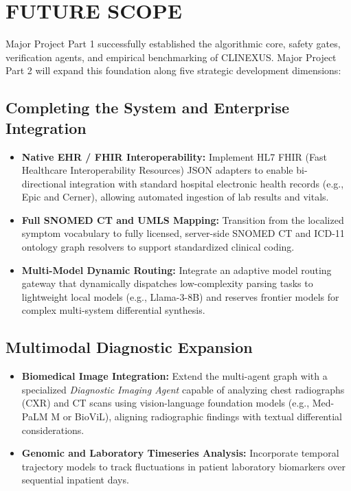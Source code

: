 \documentclass[12pt,a4paper]{report}
\begin{document}
\chapter{FUTURE SCOPE}

Major Project Part 1 successfully established the algorithmic core, safety gates, verification agents, and empirical benchmarking of CLINEXUS. Major Project Part 2 will expand this foundation along five strategic development dimensions:

\section{Completing the System and Enterprise Integration}
\begin{itemize}
    \item \textbf{Native EHR / FHIR Interoperability:} Implement HL7 FHIR (Fast Healthcare Interoperability Resources) JSON adapters to enable bi-directional integration with standard hospital electronic health records (e.g., Epic and Cerner), allowing automated ingestion of lab results and vitals.
    \item \textbf{Full SNOMED CT and UMLS Mapping:} Transition from the localized symptom vocabulary to fully licensed, server-side SNOMED CT and ICD-11 ontology graph resolvers to support standardized clinical coding.
    \item \textbf{Multi-Model Dynamic Routing:} Integrate an adaptive model routing gateway that dynamically dispatches low-complexity parsing tasks to lightweight local models (e.g., Llama-3-8B) and reserves frontier models for complex multi-system differential synthesis.
\end{itemize}

\section{Multimodal Diagnostic Expansion}
\begin{itemize}
    \item \textbf{Biomedical Image Integration:} Extend the multi-agent graph with a specialized \textit{Diagnostic Imaging Agent} capable of analyzing chest radiographs (CXR) and CT scans using vision-language foundation models (e.g., Med-PaLM M or BioViL), aligning radiographic findings with textual differential considerations.
    \item \textbf{Genomic and Laboratory Timeseries Analysis:} Incorporate temporal trajectory models to track fluctuations in patient laboratory biomarkers over sequential inpatient days.
\end{itemize}
\end{document}

